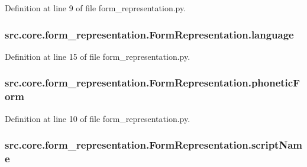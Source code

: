 Definition at line 9 of file form\+\_\+representation.\+py.

\hypertarget{classsrc_1_1core_1_1form__representation_1_1_form_representation_afd3e6d24af2c00ddf6286305aea9bb6f}{
\subsubsection[{language}]{\setlength{\rightskip}{0pt plus 5cm}src.\+core.\+form\+\_\+representation.\+Form\+Representation.\+language}}\label{classsrc_1_1core_1_1form__representation_1_1_form_representation_afd3e6d24af2c00ddf6286305aea9bb6f}


Definition at line 15 of file form\+\_\+representation.\+py.

\hypertarget{classsrc_1_1core_1_1form__representation_1_1_form_representation_aab45e1639b37a2b07631aa47729ed09d}{
\subsubsection[{phonetic\+Form}]{\setlength{\rightskip}{0pt plus 5cm}src.\+core.\+form\+\_\+representation.\+Form\+Representation.\+phonetic\+Form}}\label{classsrc_1_1core_1_1form__representation_1_1_form_representation_aab45e1639b37a2b07631aa47729ed09d}


Definition at line 10 of file form\+\_\+representation.\+py.

\hypertarget{classsrc_1_1core_1_1form__representation_1_1_form_representation_a4d1bead536706462cc8c8851ffb53ad5}{
\subsubsection[{script\+Name}]{\setlength{\rightskip}{0pt plus 5cm}src.\+core.\+form\+\_\+representation.\+Form\+Representation.\+script\+Name}}\label{classsrc_1_1core_1_1form__representation_1_1_form_representation_a4d1bead536706462cc8c8851ffb53ad5}


